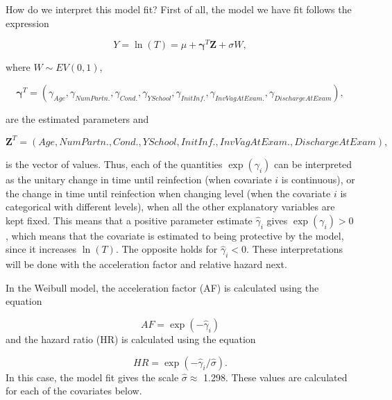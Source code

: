 \documentclass[
]{article}
\begin{document}
How do we interpret this model fit? First of all, the model we have fit follows the expression

\[
Y = \ln(T) = \mu + \mathbf{\gamma}^T\mathbf{Z} + \sigma W,  
\]

where \(W \sim EV(0,1)\),

\[
\mathbf{\gamma}^T = (\gamma_{Age}, \gamma_{NumPartn.}, \gamma_{Cond.}, \gamma_{YSchool}, \gamma_{InitInf.}, \gamma_{InvVagAtExam.}, \gamma_{DischargeAtExam}),
\]

are the estimated parameters and

\[
\mathbf{Z}^T = (Age, NumPartn., Cond., YSchool, InitInf., InvVagAtExam., DischargeAtExam), 
\]

is the vector of values. Thus, each of the quantities \(\exp(\gamma_i)\) can be interpreted as the unitary change in time until reinfection (when covariate \(i\) is continuous), or the change in time until reinfection when changing level (when the covariate \(i\) is categorical with different levels), when all the other explanatory variables are kept fixed. This means that a positive parameter estimate \(\hat{\gamma}_i\) gives \(\exp(\gamma_i) > 0\), which means that the covariate is estimated to being protective by the model, since it increases \(\ln(T)\). The opposite holds for \(\hat{\gamma}_i < 0\). These interpretations will be done with the acceleration factor and relative hazard next.

In the Weibull model, the acceleration factor (AF) is calculated using the equation

\[
AF = \exp(-\hat{\gamma}_i)
\]
and the hazard ratio (HR) is calculated using the equation

\[
HR = \exp(-\hat{\gamma}_i/\hat{\sigma}).
\]
In this case, the model fit gives the scale \(\hat{\sigma} \approx\) 1.298. These values are calculated for each of the covariates below.
\end{document}
